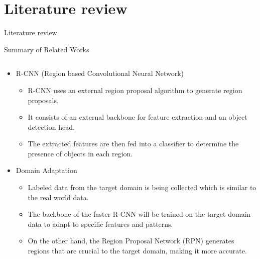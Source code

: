 \documentclass[10pt,aspectratio=169,t]{beamer}
\begin{document}
\section{Literature review}
\begin{frame}[allowframebreaks]{Literature review}
\vspace{-0.25cm}
\begin{block}{Summary of Related Works}
\end{block}
\vspace{-1.25cm}
\begin{columns}
\begin{column}{1\textwidth}
\vspace{0.25cm}
\begin{columns}
\begin{column}{1\textwidth}
\begin{itemize}
    \item R-CNN \cite{n4} (Region based Convolutional Neural Network)
    \begin{itemize}
        \item R-CNN uses an external region proposal algorithm to generate region proposals.
        \item It consists of an external backbone for feature extraction and an object detection head.
        \item The extracted features are then fed into a classifier to determine the presence of objects in each region.
    \end{itemize}
    \item Domain Adaptation \cite{n2}
    \begin{itemize}
        \item Labeled data from the target domain is being collected which is similar to the real world data.
        \item The backbone of the faster R-CNN will be trained on the target domain data to adapt to specific features and patterns.
        \item On the other hand, the Region Proposal Network (RPN) generates regions that are crucial to the target domain, making it more accurate.
    \end{itemize}
    
\end{itemize}
\end{column}
\end{columns}
\vspace{-0.25cm}
\end{column}
\end{columns}







\end{frame}
\end{document}
